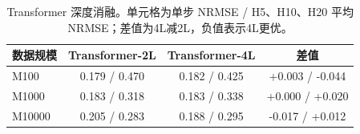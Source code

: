 
\begin{table}[H]
\centering
\caption{Transformer 深度消融。单元格为单步 NRMSE / H5、H10、H20 平均 NRMSE；差值为4L减2L，负值表示4L更优。}
\label{tab:depth}
\small
\begin{tabular}{lccc}
\toprule
数据规模 & Transformer-2L & Transformer-4L & 差值 \\
\midrule
M100 & 0.179 / 0.470 & 0.182 / 0.425 & +0.003 / -0.044 \\
M1000 & 0.183 / 0.318 & 0.183 / 0.338 & +0.000 / +0.020 \\
M10000 & 0.205 / 0.283 & 0.188 / 0.295 & -0.017 / +0.012 \\
\bottomrule
\end{tabular}
\end{table}
